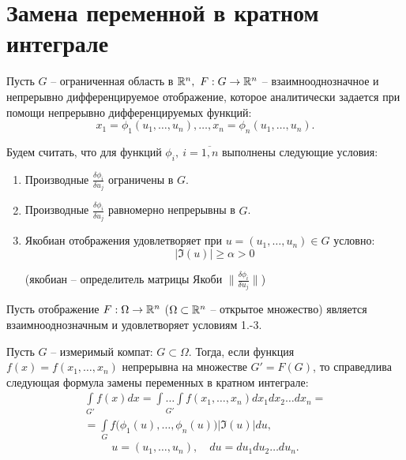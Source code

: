 

\section{Замена переменной в кратном интеграле}

\begin{note}
    Пусть $ G $ -- ограниченная область в $ \mathbb{R}^n, \ F: G \rightarrow \mathbb{R}^n $ -- взаимнооднозначное и непрерывно дифференцируемое отображение, которое аналитически задается при помощи непрерывно дифференцируемых функций:
    \[
        x_1 = \phi_1(u_1,\ldots,u_n),\ldots,x_n = \phi_n(u_1,\ldots,u_n).
    \]

    Будем считать, что для функций $ \phi_i, \ i = \overline{1,n} $ выполнены следующие условия:
    \begin{enumerate}
        \item Производные $ \frac{\delta \phi_i}{\delta u_j} $ ограничены в $ G $.
        \item Производные $ \frac{\delta \phi_i}{\delta u_j} $ равномерно непрерывны в $ G $.
        \item Якобиан отображения удовлетворяет при $ u = (u_1,\ldots,u_n) \in G $ условно:
              \[
                  \big|\mathfrak{I}(u)\big| \geqslant \alpha > 0
              \]
              \begin{center}
                  (якобиан -- определитель матрицы Якоби $ \|\frac{\delta \phi_i}{\delta u_j}\| $)
              \end{center}
    \end{enumerate}
\end{note}

\begin{theorem}
    Пусть отображение $ F: \Omega \rightarrow \mathbb{R}^n $ ($ \Omega \subset \mathbb{R}^n $ -- открытое множество) является взаимнооднозначным и удовлетворяет условиям 1.-3.

    Пусть $ G $ -- измеримый компат: $ G \subset \Omega $. Тогда, если функция $ f(x) = f(x_1,\ldots,x_n) $ непрерывна на множестве $ G'=F(G) $, то справедлива следующая формула замены переменных в кратном интеграле:
    \begin{multline*}
        \int\limits_{G'}f(x)dx = \underset{G'}{\int\ldots\int}f(x_1,\ldots,x_n)dx_1dx_2\ldots dx_n = \\
        = \int\limits_G f\big(\phi_1(u),\ldots,\phi_n(u)\big)\big|\mathfrak{I}(u)\big|du,
    \end{multline*}
    \[
        u = (u_1,\ldots,u_n), \quad du = du_1du_2\ldots du_n.
    \]
\end{theorem}

